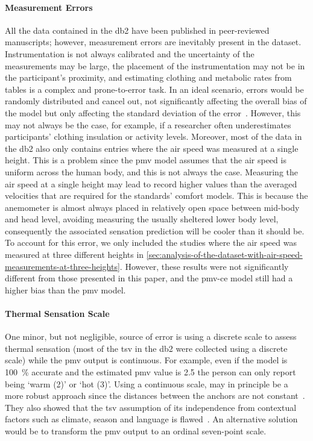\paragraph{Measurement Errors}
All the data contained in the \ac{db2} have been published in peer-reviewed manuscripts; however, measurement errors are inevitably present in the dataset.
Instrumentation is not always calibrated and the uncertainty of the measurements may be large, the placement of the instrumentation may not be in the participant's proximity, and estimating clothing and metabolic rates from tables is a complex and prone-to-error task.
In an ideal scenario, errors would be randomly distributed and cancel out, not significantly affecting the overall bias of the model but only affecting the standard deviation of the error~\cite{Humphreys2002}.
However, this may not always be the case, for example, if a researcher often underestimates participants' clothing insulation or activity levels.
Moreover, most of the data in the \ac{db2} also only contains entries where the air speed was measured at a single height.
This is a problem since the \ac{pmv} model assumes that the air speed is uniform across the human body, and this is not always the case.
Measuring the air speed at a single height may lead to record higher values than the averaged velocities that are required for the standards’ comfort models.
This is because the anemometer is almost always placed in relatively open space between mid-body and head level, avoiding measuring the usually sheltered lower body level, consequently the associated sensation prediction will be cooler than it should be.
To account for this error, we only included the studies where the air speed was measured at three different heights in \ref{sec:analysis-of-the-dataset-with-air-speed-measurements-at-three-heights}.
However, these results were not significantly different from those presented in this paper, and the \ac{pmv-ce} model still had a higher bias than the \ac{pmv} model.

\paragraph{Thermal Sensation Scale}
One minor, but not negligible, source of error is using a discrete scale to assess thermal sensation (most of the \ac{tsv} in the \ac{db2} were collected using a discrete scale) while the \ac{pmv} output is continuous.
For example, even if the model is \qty{100}{\percent} accurate and the estimated \ac{pmv} value is \num{2.5} the person can only report being `warm (\num{2})' or `hot (\num{3})'.
Using a continuous scale, may in principle be a more robust approach since the distances between the anchors are not constant~\cite{schweiker2019scales, schweiker2020evaluating}.
They also showed that the \ac{tsv} assumption of its independence from contextual factors such as climate, season and language is flawed~\cite{schweiker2019scales, schweiker2020evaluating}.
An alternative solution would be to transform the \ac{pmv} output to an ordinal seven-point scale.